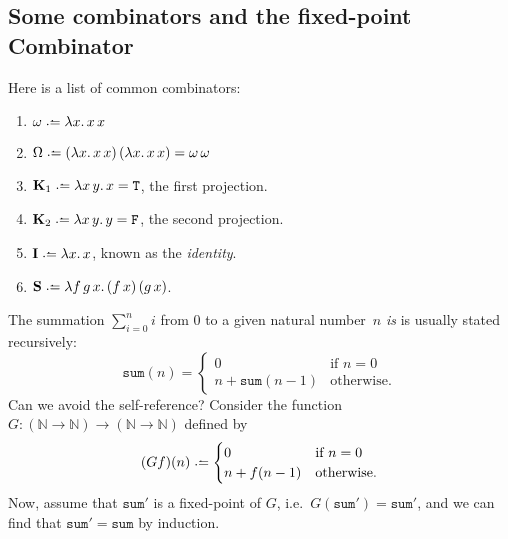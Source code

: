 \subsection{Some combinators and the fixed-point Combinator}
Here is a list of common combinators:
\begin{enumerate}
  \item $\omega \defeq \lambda x.\, x\,x$
  \item $\Omega \defeq (\lambda x.\, x\,x)\,(\lambda x.\,x\,x)
    = \omega\,\omega$
  \item $\mathbf{K}_1 \defeq \lambda x\,y.\, x = \mathtt{T}$, the first projection.
  \item $\mathbf{K}_2 \defeq \lambda x\,y.\, y = \mathtt{F}$, the second projection.
  \item $\mathbf{I} \defeq \lambda x.\, x$, known as the \emph{identity}.
  \item $\mathbf{S}\defeq\lambda f\,g\,x.\, 
    (f\,x)\,(g\,x)$.
\end{enumerate}
\begin{example}
  The summation $\sum_{i = 0}^{n} i$ from $0$ to a given natural number~$n$
  \emph{is} is usually stated recursively:
  \[
    \mathtt{sum}(n) =
      \begin{cases} 
       0 & \text{if } n = 0 \\
       n + \mathtt{sum}(n - 1)  & \text{otherwise}.
      \end{cases}
  \]
  Can we avoid the self-reference? Consider the function
  $G\colon (\mathbb{N} \to \mathbb{N}) \to (\mathbb{N} \to \mathbb{N})$
  defined by
  \begin{equation} \label{eq:summation}
    (Gf)(n) \defeq
    \begin{cases}
       0 & \text{if } n = 0 \\
       n + f(n - 1)  & \text{otherwise}.
    \end{cases}
  \end{equation}
  Now, assume that $\mathtt{sum}'$ is a fixed-point of $G$, i.e.\
  $G(\mathtt{sum}') =\mathtt{sum}'$, and we can find that $\mathtt{sum}' =
  \mathtt{sum}$ by induction. 
\end{example}

